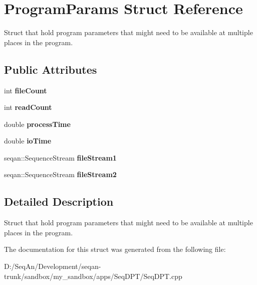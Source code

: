 \hypertarget{struct_program_params}{\section{Program\-Params Struct Reference}
\label{struct_program_params}
}


Struct that hold program parameters that might need to be available at multiple places in the program.  


\subsection*{Public Attributes}
\begin{DoxyCompactItemize}
\item 
\hypertarget{struct_program_params_a70461e1706b9ca1639b271454d602852}{int {\bfseries file\-Count}}\label{struct_program_params_a70461e1706b9ca1639b271454d602852}

\item 
\hypertarget{struct_program_params_a8deb8c9b0c8e1d6e4edde11298f88954}{int {\bfseries read\-Count}}\label{struct_program_params_a8deb8c9b0c8e1d6e4edde11298f88954}

\item 
\hypertarget{struct_program_params_a108ec56ae620ce7e0ca40fa050f6a93a}{double {\bfseries process\-Time}}\label{struct_program_params_a108ec56ae620ce7e0ca40fa050f6a93a}

\item 
\hypertarget{struct_program_params_a89fcbdab4dbb81042ac81681c490f01c}{double {\bfseries io\-Time}}\label{struct_program_params_a89fcbdab4dbb81042ac81681c490f01c}

\item 
\hypertarget{struct_program_params_a81969e289b361114586bbd26c03d99b6}{seqan\-::\-Sequence\-Stream {\bfseries file\-Stream1}}\label{struct_program_params_a81969e289b361114586bbd26c03d99b6}

\item 
\hypertarget{struct_program_params_a7b47e0313a409c5b932aa8c1074118ca}{seqan\-::\-Sequence\-Stream {\bfseries file\-Stream2}}\label{struct_program_params_a7b47e0313a409c5b932aa8c1074118ca}

\end{DoxyCompactItemize}


\subsection{Detailed Description}
Struct that hold program parameters that might need to be available at multiple places in the program. 

The documentation for this struct was generated from the following file\-:\begin{DoxyCompactItemize}
\item 
D\-:/\-Seq\-An/\-Development/seqan-\/trunk/sandbox/my\-\_\-sandbox/apps/\-Seq\-D\-P\-T/Seq\-D\-P\-T.\-cpp\end{DoxyCompactItemize}
